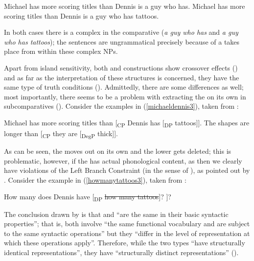 \largerpage[1]
\ea \label{michaeltattoo3}
\ea	*Michael has more scoring titles than Dennis is a guy who has.
\ex	*Michael has more scoring titles than Dennis is a guy who has tattoos.
\z
\z

In both cases there is a complex  in the comparative  (\textit{a guy who has} and \textit{a guy who has tattoos}); the sentences are ungrammatical precisely because  of a  takes place from within these complex NPs.

Apart from island sensitivity, both  and  constructions show crossover effects (\citealt[558--559]{kennedy2002}) and as far as the interpretation of these structures is concerned, they have the same type of truth conditions (\citealt[559]{kennedy2002}). Admittedly, there are some differences as well; most importantly, there seems to be a problem with extracting the  on its own in subcomparatives (\citealt[563--564]{kennedy2002}). Consider the examples in (\ref{michaeldennis3}), taken from \citet[564, ex. 32]{kennedy2002}:

\ea \label{michaeldennis3}
\ea	Michael has more scoring titles than [\textsubscript{CP}  Dennis has [\textsubscript{DP} \sout{} tattoos]].
\ex	The shapes are longer than [\textsubscript{CP}  they are [\textsubscript{DegP} \sout{} thick]].
\z
\z

As can be seen, the  moves out on its own and the lower  gets deleted; this is problematic, however, if the  has actual phonological content, as then we clearly have violations of the Left Branch Constraint (in the sense of \citealt{ross1967diss}), as pointed out by \citet[564]{kennedy2002}. Consider the example in (\ref{howmanytattoos3}), taken from \citet[564, ex. 33]{kennedy2002}:

\ea \label{howmanytattoos3}
\ea	*How many does Dennis have [\textsubscript{DP} \sout{how many tattoos}]?
\ex	*[\textsubscript{CP} How were the shapes [\textsubscript{DegP} \sout{how thick}]]?
\z
\z
	
The conclusion drawn by \citet[570]{kennedy2002} is that  and  ``are the same in their basic syntactic properties''; that is, both involve ``the same functional vocabulary and are subject to the same syntactic operations'' but they ``differ in the level of representation at which these operations apply''. Therefore, while the two types ``have structurally identical  representations'', they have ``structurally distinct  representations'' (\citealt[571]{kennedy2002}).

